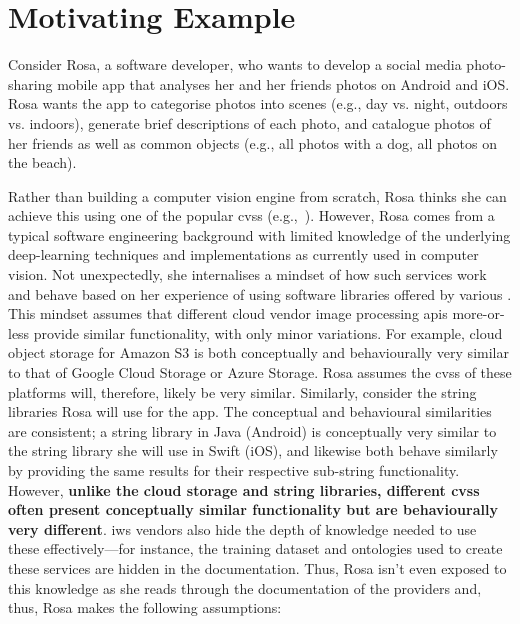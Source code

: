 \section{Motivating Example}
\label{icsme2019:sec:motivating-example}

Consider Rosa, a software developer, who wants to develop a social media photo-sharing mobile app that analyses her and her friends photos on Android and iOS. Rosa wants the app to categorise photos into scenes (e.g., day vs. night, outdoors vs. indoors), generate brief descriptions of each photo, and catalogue photos of her friends as well as common objects (e.g., all photos with a dog, all photos on the beach).

Rather than building a computer vision engine from scratch, Rosa thinks she can achieve this using one of the popular \glspl{cvs} (e.g.,~). However, Rosa comes from a typical software engineering background with limited knowledge of the underlying deep-learning techniques and implementations as currently used in computer vision. Not unexpectedly, she internalises a mindset of how such services work and behave based on her experience of using software libraries offered by various . This mindset assumes that different cloud vendor image processing \glspl{api} more-or-less provide similar functionality, with only minor variations. For example, cloud object storage for Amazon S3 is both conceptually and behaviourally very similar to that of Google Cloud Storage or Azure Storage. Rosa assumes the \glspl{cvs} of these platforms will, therefore, likely be very similar. Similarly, consider the string libraries Rosa will use for the app. The conceptual and behavioural similarities are consistent; a string library in Java (Android) is conceptually very similar to the string library she will use in Swift (iOS), and likewise both behave similarly by providing the same results for their respective sub-string functionality. However, \textbf{unlike the cloud storage and string libraries, different \glspl{cvs} often present conceptually similar functionality but are behaviourally very different}. \Gls{iws} vendors also hide the depth of knowledge needed to use these effectively---for instance, the training dataset and ontologies used to create these services are hidden in the documentation. Thus, Rosa isn't even exposed to this knowledge as she reads through the documentation of the providers and, thus, Rosa makes the following assumptions:

